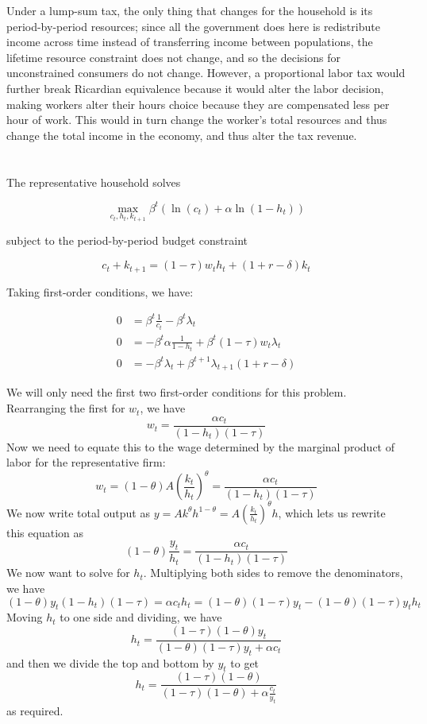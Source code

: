\documentclass[12pt, letterpaper, parskip = full]{article}
\begin{document}
	Under a lump-sum tax, the only thing that changes for the household is its period-by-period resources; since all the government does here is redistribute income across time instead of transferring income between populations, the lifetime resource constraint does not change, and so the decisions for unconstrained consumers do not change. However, a proportional labor tax would further break Ricardian equivalence because it would alter the labor decision, making workers alter their hours choice because they are compensated less per hour of work. This would in turn change the worker's total resources and thus change the total income in the economy, and thus alter the tax revenue.
	
	\section{}

	The representative household solves

	\[ \max_{c_t, h_t, k_{t+1}} \beta^t \left( \ln(c_t) + \alpha \ln(1 - h_t) \right)     \]

	subject to the period-by-period budget constraint 

	\[ c_t + k_{t+1} = (1 - \tau) w_t h_t + (1 + r - \delta) k_t  \]

	Taking first-order conditions, we have:

	\begin{align*}
	0 &= \beta^t \frac{1}{c_t} - \beta^t \lambda_t \\
	0 &= - \beta^t \alpha \frac{1}{1 - h_t} + \beta^t (1 - \tau) w_t \lambda_t \\
	0 &= - \beta^t \lambda_t + \beta^{t+1} \lambda_{t+1} (1 + r - \delta)
	\end{align*}

	We will only need the first two first-order conditions for this problem. Rearranging the first for \(w_t\), we have
	\[ w_t = \frac{\alpha c_t }{(1 - h_t) (1 - \tau)}  \]
	Now we need to equate this to the wage determined by the marginal product of labor for the representative firm:
	\[ w_t = (1 - \theta) A \left(\frac{k_t}{h_t}\right)^\theta = \frac{\alpha c_t}{(1 - h_t)(1-\tau)}  \] 
	We now write total output as \(y = A k^\theta h^{1-\theta} = A \left(\frac{k_t}{h_t}\right)^\theta h \), which lets us rewrite this equation as 
	\[ (1 - \theta) \frac{y_t}{h_t} = \frac{\alpha c_t}{(1 - h_t)(1 - \tau)}    \] 
	We now want to solve for \(h_t\). Multiplying both sides to remove the denominators, we have
	\[ (1 - \theta) y_t (1 - h_t) (1 - \tau) = \alpha c_t h_t = (1 - \theta)(1 - \tau) y_t - (1 - \theta)(1 - \tau) y_t h_t       \]
	Moving \(h_t\) to one side and dividing, we have
	\[ h_t = \frac{(1 - \tau)(1 - \theta) y_t}{(1 - \theta)(1 - \tau) y_t + \alpha c_t}   \]
	and then we divide the top and bottom by \(y_t\) to get 
	\[ h_t = \frac{(1 - \tau)(1 - \theta)}{(1 - \tau)(1 - \theta) + \alpha \frac{c_t}{y_t}}   \]
	as required.
\end{document}
